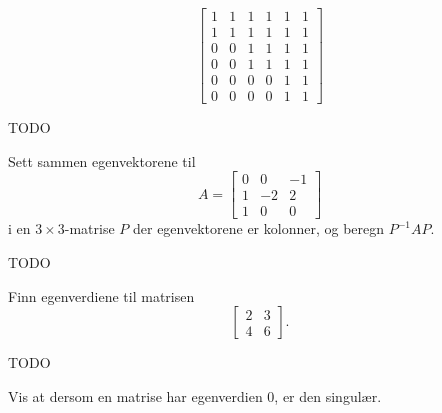 \begin{oppgave}
\begin{punkt}
\[
\begin{bmatrix}
1 & 1 & 1 & 1 & 1 & 1 \\ 1 & 1 & 1 & 1 & 1 & 1\\ 0 & 0 & 1 & 1& 1 & 1 \\ 0 & 0& 1  &1 & 1 & 1 \\ 0 & 0 & 0 & 0 & 1 & 1\\ 0 & 0 & 0 & 0 & 1 & 1 
\end{bmatrix}
\]
\end{punkt}

\end{oppgave}

\begin{losning}
TODO
\end{losning}

\begin{oppgave}
Sett sammen egenvektorene til 
\[
A=
\begin{bmatrix}
0 & 0 & -1 \\ 1 & -2 & 2 \\ 1 & 0 & 0 
\end{bmatrix}
\]
i en $3 \times 3$-matrise $P$ der egenvektorene er kolonner, og beregn $P^{-1} A P$.
\end{oppgave}

\begin{losning}
TODO
\end{losning}

\begin{oppgave}
Finn egenverdiene til matrisen 
\[
\begin{bmatrix}
2 & 3  \\ 4 & 6 
\end{bmatrix}.
\]
\end{oppgave}

\begin{losning}
TODO
\end{losning}

\begin{oppgave}
Vis at dersom en matrise har egenverdien 0, er den singulær.
\end{oppgave}



